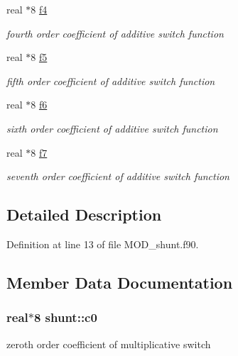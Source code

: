 \begin{DoxyCompactItemize}
real $\ast$8 \hyperlink{classshunt_a5e1a57e8ec4ef13db9bfe4c4111aba5e}{f4}
\begin{DoxyCompactList}\small\item\em fourth order coefficient of additive switch function \end{DoxyCompactList}\item 
real $\ast$8 \hyperlink{classshunt_af7dd5be34822309bd4c84b1bc7a85a41}{f5}
\begin{DoxyCompactList}\small\item\em fifth order coefficient of additive switch function \end{DoxyCompactList}\item 
real $\ast$8 \hyperlink{classshunt_aba5200d09f67d4c9eb4c7eb6e79d9cb2}{f6}
\begin{DoxyCompactList}\small\item\em sixth order coefficient of additive switch function \end{DoxyCompactList}\item 
real $\ast$8 \hyperlink{classshunt_a4f12a67da810f34db385d9e119e42322}{f7}
\begin{DoxyCompactList}\small\item\em seventh order coefficient of additive switch function \end{DoxyCompactList}\end{DoxyCompactItemize}


\subsection{Detailed Description}


Definition at line 13 of file M\-O\-D\-\_\-shunt.\-f90.



\subsection{Member Data Documentation}
\hypertarget{classshunt_aabf25759c6848e59a6563aec38086b44}{
\subsubsection[{c0}]{\setlength{\rightskip}{0pt plus 5cm}real$\ast$8 shunt\-::c0}}\label{classshunt_aabf25759c6848e59a6563aec38086b44}


zeroth order coefficient of multiplicative switch 



